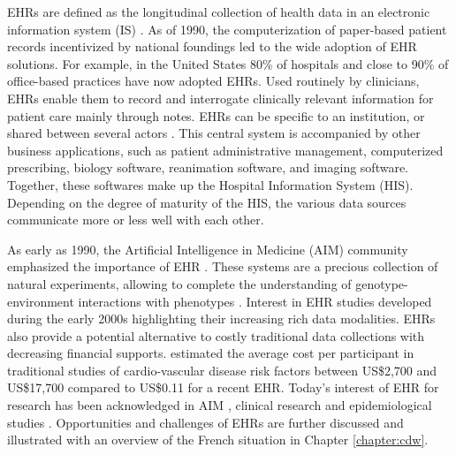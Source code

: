 \documentclass[french,12pt,twoside,a4paper]{book}
\begin{document}
\begin{background_box_left}
  EHRs are defined as the longitudinal collection of health data in an
  electronic information system (IS) \citep{gunter2005emergence}. As of 1990,
  the computerization of paper-based patient records incentivized by national
  foundings led to the wide adoption of EHR solutions. For example, in the
  United States 80\% of hospitals \citep{adler2017electronic} and close to 90\%
  of office-based practices \citep{office_adoption_2023} have now adopted EHRs.
  Used routinely by clinicians, EHRs enable them to record and interrogate
  clinically relevant information for patient care mainly through notes. EHRs
  can be specific to an institution, or shared between several actors
  \citep{hoerbst2010electronic}. This central system is accompanied by other
  business applications, such as patient administrative management, computerized
  prescribing, biology software, reanimation software, and imaging software.
  Together, these softwares make up the Hospital Information System (HIS).
  Depending on the degree of maturity of the HIS, the various data sources
  communicate more or less well with each other.

  As early as 1990, the Artificial Intelligence in Medicine (AIM) community
  emphasized the importance of EHR \citep{shortliffe1993adolescence}. These
  systems are a precious collection of natural experiments, allowing to complete
  the understanding of genotype-environment interactions with phenotypes
  \citep{butte2006creation,patel2009coming}. Interest in EHR studies developed
  during the early 2000s highlighting their increasing rich data modalities.
  EHRs also provide a potential alternative to costly traditional data collections
  with decreasing financial supports. \cite{casey2016using} estimated the
  average cost per participant in traditional studies of cardio-vascular disease
  risk factors between US\$2,700 and US\$17,700 compared to US\$0.11 for a recent EHR.
  Today's interest of EHR for research has been acknowledged in AIM
  \citep{yu2018artificial}, clinical research \citep{cowie2017electronic} and
  epidemiological studies \citep{casey2016using,gianfrancesco2021narrative}.
  Opportunities and challenges of EHRs are further discussed and illustrated
  with an overview of the French situation in Chapter \ref{chapter:cdw}.



\end{background_box_left}
\end{document}
